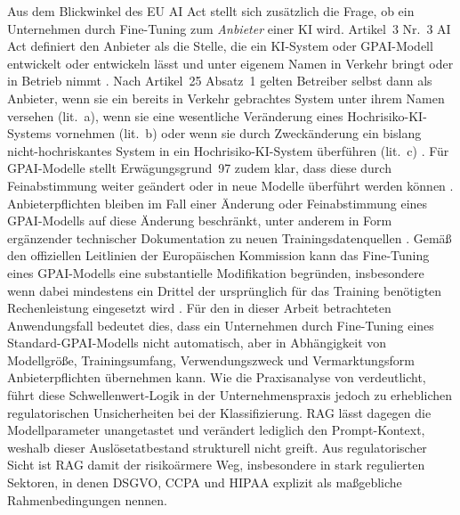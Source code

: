 Aus dem Blickwinkel des EU AI Act stellt sich zusätzlich die Frage, ob ein Unternehmen durch Fine-Tuning zum \textit{Anbieter} einer KI wird. Artikel~3 Nr.~3 AI Act definiert den Anbieter als die Stelle, die ein KI-System oder GPAI-Modell entwickelt oder entwickeln lässt und unter eigenem Namen in Verkehr bringt oder in Betrieb nimmt \autocite[Art.~3 Nr.~3]{EuropaischesParlamentundRat.2024}. Nach Artikel~25 Absatz~1 gelten Betreiber selbst dann als Anbieter, wenn sie ein bereits in Verkehr gebrachtes System unter ihrem Namen versehen (lit.~a), wenn sie eine wesentliche Veränderung eines Hochrisiko-KI-Systems vornehmen (lit.~b) oder wenn sie durch Zweckänderung ein bislang nicht-hochriskantes System in ein Hochrisiko-KI-System überführen (lit.~c) \autocite[Art.~25 Abs.~1]{EuropaischesParlamentundRat.2024}. Für GPAI-Modelle stellt Erwägungsgrund~97 zudem klar, dass diese durch Feinabstimmung weiter geändert oder in neue Modelle überführt werden können \autocite[Erwägungsgrund~97]{EuropaischesParlamentundRat.2024}.
Anbieterpflichten bleiben im Fall einer Änderung oder Feinabstimmung eines GPAI-Modells auf diese Änderung beschränkt, unter anderem in Form ergänzender technischer Dokumentation zu neuen Trainingsdatenquellen \autocite[Erwägungsgrund~109]{EuropaischesParlamentundRat.2024}.
Gemäß den offiziellen Leitlinien der Europäischen Kommission kann das Fine-Tuning eines GPAI-Modells eine substantielle Modifikation begründen, insbesondere wenn dabei mindestens ein Drittel der ursprünglich für das Training benötigten Rechenleistung eingesetzt wird \autocite[Rn.~61]{EuropeanCommission.2025}.
Für den in dieser Arbeit betrachteten Anwendungsfall bedeutet dies, dass ein Unternehmen durch Fine-Tuning eines Standard-GPAI-Modells nicht automatisch, aber in Abhängigkeit von Modellgröße, Trainingsumfang, Verwendungszweck und Vermarktungsform Anbieterpflichten übernehmen kann.
Wie die Praxisanalyse von \textcite{Endal.2025} verdeutlicht, führt diese Schwellenwert-Logik in der Unternehmenspraxis jedoch zu erheblichen regulatorischen Unsicherheiten bei der Klassifizierung. %
RAG lässt dagegen die Modellparameter unangetastet und verändert lediglich den Prompt-Kontext, weshalb dieser Auslösetatbestand strukturell nicht greift. \autocite[1]{Balaguer.2024}
Aus regulatorischer Sicht ist RAG damit der risikoärmere Weg, insbesondere in stark regulierten Sektoren, in denen
\textcite[vgl.][20]{Karakurt.2026} DSGVO, CCPA und HIPAA explizit als maßgebliche Rahmenbedingungen nennen.


